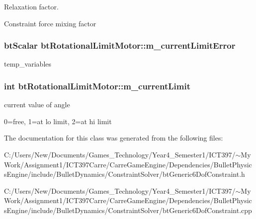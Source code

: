 Relaxation factor. 

Constraint force mixing factor \hypertarget{classbt_rotational_limit_motor_7128feccb391176842f287b584e375d3}{
\subsubsection[m\_\-currentLimitError]{\setlength{\rightskip}{0pt plus 5cm}btScalar {\bf btRotationalLimitMotor::m\_\-currentLimitError}}}
\label{classbt_rotational_limit_motor_7128feccb391176842f287b584e375d3}


temp\_\-variables \hypertarget{classbt_rotational_limit_motor_d1e4fa6cb3ea2e4b78c96feab97448e8}{
\subsubsection[m\_\-currentLimit]{\setlength{\rightskip}{0pt plus 5cm}int {\bf btRotationalLimitMotor::m\_\-currentLimit}}}
\label{classbt_rotational_limit_motor_d1e4fa6cb3ea2e4b78c96feab97448e8}


current value of angle 

0=free, 1=at lo limit, 2=at hi limit 

The documentation for this class was generated from the following files:\begin{CompactItemize}
\item 
C:/Users/New/Documents/Games\_\-Technology/Year4\_\-Semester1/ICT397/$\sim$My Work/Assignment1/ICT397Carre/CarreGameEngine/Dependencies/BulletPhysicsEngine/include/BulletDynamics/ConstraintSolver/btGeneric6DofConstraint.h\item 
C:/Users/New/Documents/Games\_\-Technology/Year4\_\-Semester1/ICT397/$\sim$My Work/Assignment1/ICT397Carre/CarreGameEngine/Dependencies/BulletPhysicsEngine/include/BulletDynamics/ConstraintSolver/btGeneric6DofConstraint.cpp\end{CompactItemize}
